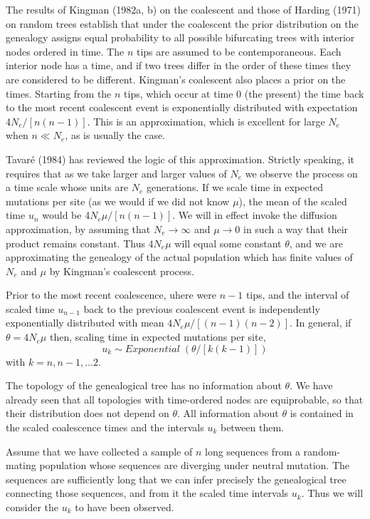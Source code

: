 The results of Kingman (1982a, b) on the coalescent and those of Harding (1971) 
on random trees establish that under the
coalescent the prior distribution on the genealogy assigns equal
probability to all possible bifurcating trees with interior nodes
ordered in time.  The $n$ tips are assumed to be contemporaneous.  Each
interior node has a time, and if two trees differ in the order of
these times they are considered to be different.  Kingman's coalescent
also places a prior on the times.  Starting from the $n$ tips, which occur at
time 0 (the present) the time back to the most recent coalescent
event is exponentially distributed with expectation 4$N_e/[n(n-1)]$.  This is an
approximation, which is excellent for large $N_e$ when $n \ll N_e$, as is
usually the case.

Tavar\'{e} (1984) has reviewed the logic of this approximation.  Strictly
speaking, it requires that as we take larger and larger values of $N_e$ we
observe the process on a time scale whose units are $N_e$ generations.  If we
scale time in expected mutations per site (as we would if we did not know $\mu$),
the mean of the scaled time $u_n$ would be 4$N_e\mu/[n(n-1)]$.  We will
in effect invoke the diffusion approximation, by assuming that 
$N_e \rightarrow \infty$ and $\mu \rightarrow 0$ in such a way that their
product remains constant.  Thus $4N_e\mu$ will equal some constant $\theta$,
and we are approximating the genealogy of the actual population which has
finite values of $N_e$ and $\mu$ by Kingman's coalescent process.

Prior to the most recent coalescence,
uhere were $n-1$ tips, and the interval of scaled time $u_{n-1}$ back to the
previous coalescent event is independently exponentially distributed with mean
$4N_e\mu/[(n-1)(n-2)]$.  In general, if $\theta = 4N_e\mu$ then, scaling time in
expected mutations per site,
\begin{equation} %
               u_k  \sim Exponential\; ( \theta/[k(k-1)] )
\end{equation}
with $k = n, n-1, ... 2$.

The topology of the genealogical tree has no information about $\theta$.  We
have already seen that all topologies with time-ordered nodes are
equiprobable, so that their distribution does not depend on $\theta$.  All
information about $\theta$ is contained in the scaled coalescence times and the
intervals $u_k$ between them.

Assume that we have collected a sample of $n$ long sequences from a
random-mating population whose sequences are diverging under neutral
mutation.  The sequences are sufficiently long that we can infer
precisely the genealogical tree connecting those sequences, and from it
the scaled time intervals $u_k$.  Thus we will consider the $u_k$ to have
been observed.

